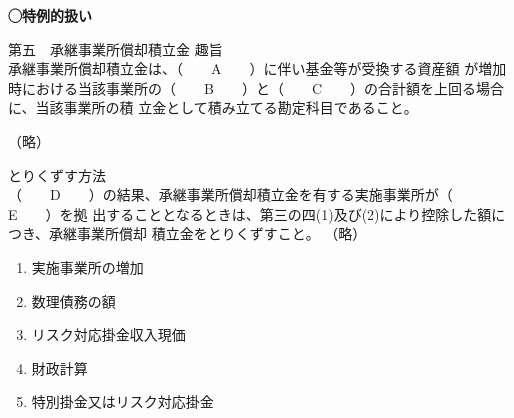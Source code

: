 \begin{fillblank}[数理人試験 H21 問題1(5) 改題]
  \noindent \textbf{◯特例的扱い}
  \begin{lawstructure}
    \begin{lawarticle}{第五　承継事業所償却積立金}{}
      趣旨
\\
    承継事業所償却積立金は、（　　A　　）に伴い基金等が受換する資産額
が増加時における当該事業所の（　　B　　）と（　　C　　）の合計額を上回る場合に、当該事業所の積
立金として積み立てる勘定科目であること。

      （略）

      とりくずす方法
      \\
      （　　D　　）の結果、承継事業所償却積立金を有する実施事業所が（　　E　　）を拠
出することとなるときは、第三の四(1)及び(2)により控除した額につき、承継事業所償却
積立金をとりくずすこと。
      （略）
     
    \end{lawarticle}
  \end{lawstructure}
\end{fillblank}

\begin{answerbox}
  \begin{enumerate}[A: ]
    \item 実施事業所の増加
    \item 数理債務の額
    \item リスク対応掛金収入現価
    \item 財政計算
    \item 特別掛金又はリスク対応掛金
  \end{enumerate}
\end{answerbox}

\newpage